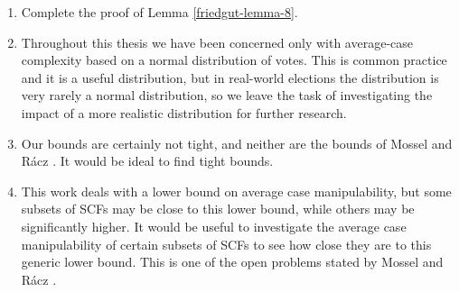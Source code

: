 	\begin{enumerate}
		\item Complete the proof of Lemma \ref{friedgut-lemma-8}.
		\item Throughout this thesis we have been concerned only with average-case complexity based on a normal distribution of votes. This is common practice and it is a useful distribution, but in real-world elections the distribution is very rarely a normal distribution, so we leave the task of investigating the impact of a more realistic distribution for further research.
		\item Our bounds are certainly not tight, and neither are the bounds of Mossel and R\'{a}cz \cite{mossel2011quantitative}. It would be ideal to find tight bounds.
		\item This work deals with a lower bound on average case manipulability, but some subsets of SCFs may be close to this lower bound, while others may be significantly higher. It would be useful to investigate the average case manipulability of certain subsets of SCFs to see how close they are to this generic lower bound. This is one of the open problems stated by Mossel and R\'{a}cz \cite{mossel2011quantitative}.
	\end{enumerate}

